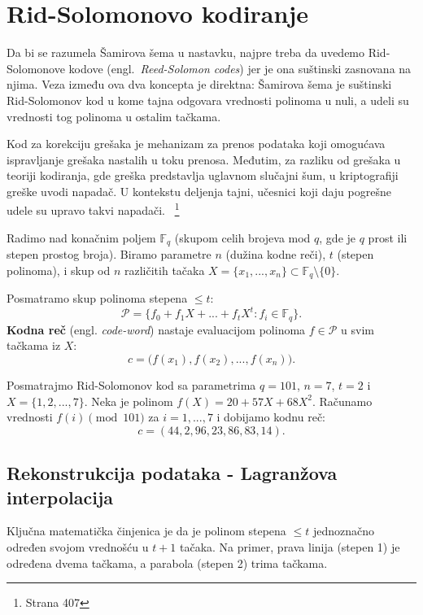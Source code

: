 \section{Rid-Solomonovo kodiranje}
Da bi se razumela Šamirova šema u nastavku, najpre treba da uvedemo Rid-Solomonove kodove (engl.\ \textit{Reed-Solomon codes}) jer je ona suštinski zasnovana na njima. Veza između ova dva koncepta je direktna: Šamirova šema je suštinski Rid-Solomonov kod u kome tajna odgovara vrednosti polinoma u nuli, a udeli su vrednosti tog polinoma u ostalim tačkama.

Kod za korekciju grešaka je mehanizam za prenos podataka koji omogućava ispravljanje grešaka nastalih u toku prenosa. Međutim, za razliku od grešaka u teoriji kodiranja, gde greška predstavlja uglavnom slučajni šum, u kriptografiji greške uvodi napadač. U kontekstu deljenja tajni, učesnici koji daju pogrešne udele su upravo takvi napadači. ~\cite{smart2016cryptography}\footnote{Strana 407}

Radimo nad konačnim poljem $\mathbb{F}_q$ (skupom celih brojeva mod $q$, gde je $q$ prost ili stepen prostog broja). Biramo parametre $n$ (dužina kodne reči), $t$ (stepen polinoma), i skup od $n$ različitih tačaka $X = \{x_1, ..., x_n\} \subset \mathbb{F}_q \setminus \{0\}$.
 
Posmatramo skup polinoma stepena $\leq t$:
\[\mathcal{P} = \bigl\{f_0 + f_1 X + ... + f_t X^t : f_i \in \mathbb{F}_q\bigr\}.\]
\textbf{Kodna reč} (engl. \textit{code-word}) nastaje evaluacijom polinoma $f \in \mathcal{P}$ u svim tačkama iz $X$:
\[c = \bigl(f(x_1), f(x_2), ..., f(x_n)\bigr).\]

\begin{example}\label{primer-rs}
Posmatrajmo Rid-Solomonov kod sa parametrima $q = 101$, $n = 7$, $t = 2$ i $X = \{1, 2, ..., 7\}$. Neka je polinom $f(X) = 20 + 57X + 68X^2$. Računamo vrednosti $f(i) \pmod{101}$ za $i = 1, ..., 7$ i dobijamo kodnu reč:
\[c = (44, 2, 96, 23, 86, 83, 14).\]
\end{example}

\subsection{Rekonstrukcija podataka - Lagranžova interpolacija}
 
Ključna matematička činjenica je da je polinom stepena $\leq t$ jednoznačno određen svojom vrednošću u $t+1$ tačaka. Na primer, prava linija (stepen 1) je određena dvema tačkama, a parabola (stepen 2) trima tačkama.
 
